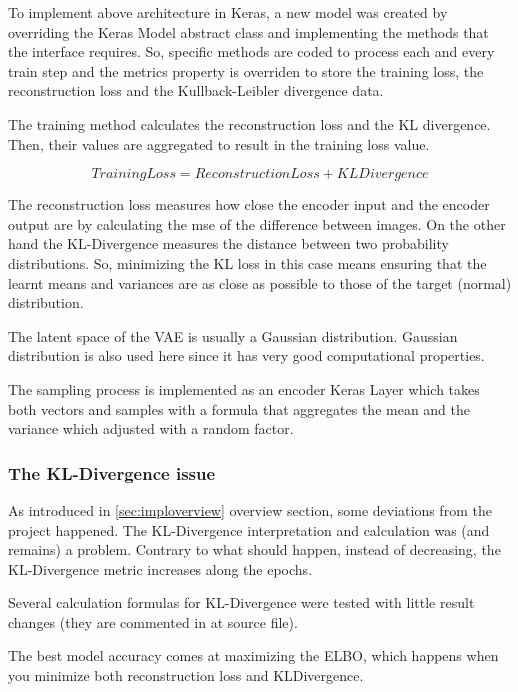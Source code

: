 To implement above architecture in Keras, a new model was created by overriding the Keras Model abstract class and implementing the methods that the interface requires. So, specific methods are coded to process each and every train step and the metrics property is overriden to store the training loss, the reconstruction loss and the Kullback-Leibler divergence data.

The training method calculates the reconstruction loss and the KL divergence. Then, their values are aggregated to result in the training loss value.

\begin{equation}
    Training Loss = Reconstruction Loss + KL Divergence
\end{equation}

The reconstruction loss measures how close the encoder input and the encoder output are by calculating the \acrshort{mse} of the difference between images. On the other hand the KL-Divergence measures the distance between two probability distributions. So, minimizing the KL loss in this case means ensuring that the learnt means and variances are as close as possible to those of the target (normal) distribution.

The latent space of the VAE is usually a Gaussian distribution. Gaussian distribution is also used here since it has very good computational properties. 

The sampling process is implemented as an encoder Keras Layer which takes both vectors and samples with a formula that aggregates the mean and the variance which adjusted with a random factor.


\subsubsection*{The KL-Divergence issue}

As introduced in \ref*{sec:imploverview} overview section, some deviations from the project happened. The KL-Divergence interpretation and calculation was (and remains) a problem. Contrary to what should happen, instead of decreasing, the KL-Divergence metric increases along the epochs. 

Several calculation formulas for KL-Divergence were tested with little result changes (they are commented in at source file). 

The best model accuracy comes at maximizing the ELBO, which happens when you minimize both reconstruction loss and KL\-Divergence.

